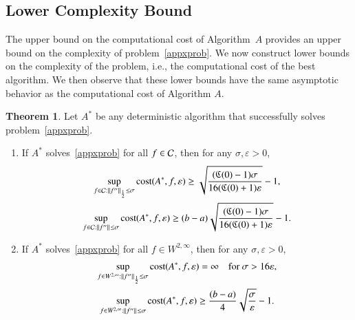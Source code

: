 \documentclass[review]{elsarticle}
\newcommand{\abstol}{\varepsilon}
\theoremstyle{definition}
\renewcommand{\cw}{W}
\newtheorem{theorem}{Theorem}
\begin{document}
\subsection{Lower Complexity Bound} \label{subsec:appxcomp}

The upper bound on the computational cost of Algorithm~$A$ provides an upper
bound on the complexity of problem~\eqref{appxprob}. We now construct lower
bounds on the complexity of the problem, i.e., the computational cost of the
best algorithm. We then observe that these lower bounds have the same asymptotic
behavior as the computational cost of Algorithm $A$.

\begin{theorem}
	Let $A^*$ be any deterministic algorithm that successfully solves 
	problem~\eqref{appxprob}.
	
	\begin{enumerate}
		\renewcommand{\labelenumi}{\roman{enumi}.}
		\item  If $A^*$ solves~\eqref{appxprob} for all $f \in \mathcal{C}$, then for any $\sigma, \abstol >0$,
		\begin{subequations} \label{lowbdC}
		\begin{gather}
		\sup_{f \in \cc : \norm[\frac12]{f''} \le\sigma } \cost(A^*,f,\abstol) \ge \sqrt{\frac{(\fC(0)-1)\sigma}{16(\fC(0)+1)\abstol}} -1, \label{lowbdChalf}\\
		\sup_{f \in \cc : \norm{f''} \le\sigma } \cost(A^*,f,\abstol) \ge (b-a)\sqrt{\frac{(\fC(0)-1)\sigma}{16(\fC(0)+1)\abstol}} -1 \label{lowbdCinf}.
		\end{gather}
		\end{subequations}
		
		\item If $A^*$ solves~\eqref{appxprob} for all $f \in  \cw^{2,\infty}$, then for any 
		$\sigma, \abstol >0$,
		\begin{subequations} \label{lowbdW}
		\begin{gather}
		\sup_{f \in \cw^{2,\infty} : \norm[\frac12]{f''} \le \sigma} \cost(A^*,f,\abstol) 
		= \infty \quad \text{for } \sigma > 16 \abstol, \label{lowbdWhalf}\\
		\sup_{f \in \cw^{2,\infty} : \norm{f''} \le\sigma } \cost(A^*,f,\abstol) 
		\ge \frac{(b-a)}{4} \sqrt{\frac{\sigma}{\abstol}} - 1.  \label{lowbdWinf}
		\end{gather}
		\end{subequations}
				
	\end{enumerate}
	\label{thm:A_cost}
\end{theorem}
\end{document}

